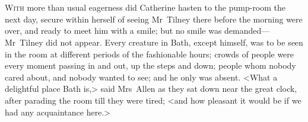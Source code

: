 \chapter[Chapter \thechapter]{}
	
 \lettrine{W}{ith} more than usual eagerness did Catherine hasten to the pump-room the next day, secure within herself of seeing Mr~Tilney there before the morning were over, and ready to meet him with a smile; but no smile was demanded—Mr~Tilney did not appear. Every creature in Bath, except himself, was to be seen in the room at different periods of the fashionable hours; crowds of people were every moment passing in and out, up the steps and down; people whom nobody cared about, and nobody wanted to see; and he only was absent. <What a delightful place Bath is,> said Mrs~Allen as they sat down near the great clock, after parading the room till they were tired; <and how pleasant it would be if we had any acquaintance here.> 

